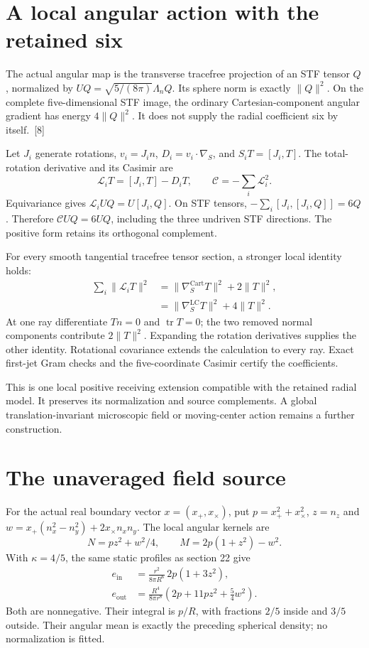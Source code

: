 \documentclass[10pt,twocolumn,letterpaper]{article}
\begin{document}
\section{A local angular action with the retained six}
The actual angular map is the transverse tracefree projection of an STF tensor $Q$, normalized by $UQ=\sqrt{5/(8\pi)}\Lambda_nQ$. Its sphere norm is exactly $\lVert Q\rVert^2$. On the complete five-dimensional STF image, the ordinary Cartesian-component angular gradient has energy $4\lVert Q\rVert^2$. It does not supply the radial coefficient six by itself.~[8]

Let $J_i$ generate rotations, $v_i=J_i n$, $D_i=v_i\cdot\nabla_S$, and $S_iT=[J_i,T]$. The total-rotation derivative and its Casimir are
\[
\mathcal L_iT=[J_i,T]-D_iT,\qquad \mathcal C=-\sum_i\mathcal L_i^2.
\]
Equivariance gives $\mathcal L_iUQ=U[J_i,Q]$. On STF tensors, $-\sum_i[J_i,[J_i,Q]]=6Q$. Therefore $\mathcal CUQ=6UQ$, including the three undriven STF directions. The positive form retains its orthogonal complement.

For every smooth tangential tracefree tensor section, a stronger local identity holds:
\[
\begin{aligned}
\sum_i\lVert\mathcal L_iT\rVert^2
 &=\lVert\nabla_S^{\mathrm{Cart}}T\rVert^2+2\lVert T\rVert^2,\\
 &=\lVert\nabla_S^{\mathrm{LC}}T\rVert^2+4\lVert T\rVert^2.
\end{aligned}
\]
At one ray differentiate $Tn=0$ and $\operatorname{tr}T=0$; the two removed normal components contribute $2\lVert T\rVert^2$. Expanding the rotation derivatives supplies the other identity. Rotational covariance extends the calculation to every ray. Exact first-jet Gram checks and the five-coordinate Casimir certify the coefficients.

This is one local positive receiving extension compatible with the retained radial model. It preserves its normalization and source complements. A global translation-invariant microscopic field or moving-center action remains a further construction.

\section{The unaveraged field source}
For the actual real boundary vector $x=(x_+,x_\times)$, put $p=x_+^2+x_\times^2$, $z=n_z$ and $w=x_+(n_x^2-n_y^2)+2x_\times n_xn_y$. The local angular kernels are
\[
N=pz^2+w^2/4,\qquad M=2p(1+z^2)-w^2.
\]
With $\kappa=4/5$, the same static profiles as section 22 give
\[
\begin{aligned}
e_{\mathrm{in}}&=\frac{r^2}{8\pi R^6}\,2p(1+3z^2),\\
e_{\mathrm{out}}&=\frac{R^4}{8\pi r^8}\left(2p+11pz^2+\frac54w^2\right).
\end{aligned}
\]
Both are nonnegative. Their integral is $p/R$, with fractions $2/5$ inside and $3/5$ outside. Their angular mean is exactly the preceding spherical density; no normalization is fitted.
\end{document}
